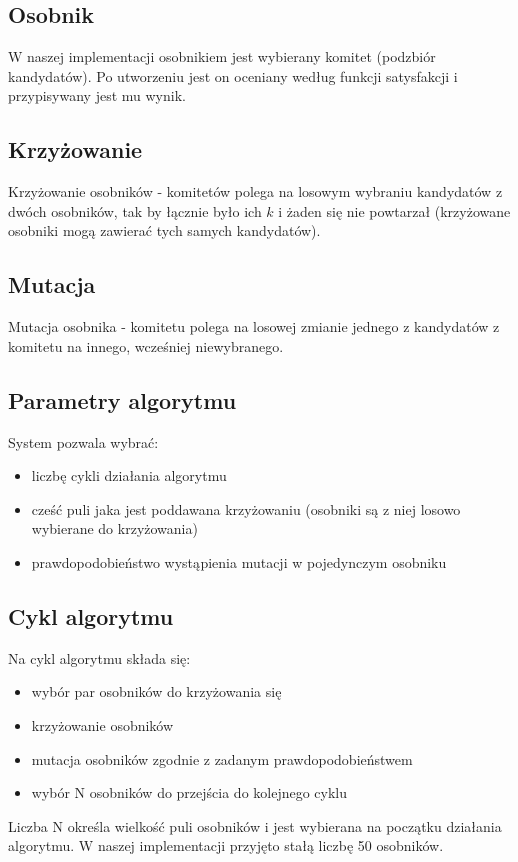 \documentclass[pdflatex,11pt]{../aghdoc_version2}
\begin{document}
\subsection{Osobnik}
W naszej implementacji osobnikiem jest wybierany komitet (podzbiór kandydatów). 
Po utworzeniu jest on oceniany według funkcji satysfakcji i przypisywany jest mu wynik.

\subsection{Krzyżowanie}
Krzyżowanie osobników - komitetów polega na losowym wybraniu kandydatów z dwóch osobników, tak by łącznie było ich $k$ i żaden się nie powtarzał (krzyżowane osobniki mogą zawierać tych samych kandydatów).

\subsection{Mutacja}
Mutacja osobnika - komitetu polega na losowej zmianie jednego z kandydatów z komitetu na innego, wcześniej niewybranego.

\subsection{Parametry algorytmu}
System pozwala wybrać:
\begin{itemize}
\item liczbę cykli działania algorytmu
\item cześć puli jaka jest poddawana krzyżowaniu (osobniki są z niej losowo wybierane do krzyżowania)
\item prawdopodobieństwo wystąpienia mutacji w pojedynczym osobniku
\end{itemize}

\subsection{Cykl algorytmu}
Na cykl algorytmu składa się:
\begin{itemize}
\item wybór par osobników do krzyżowania się
\item krzyżowanie osobników
\item mutacja osobników zgodnie z zadanym prawdopodobieństwem
\item wybór N osobników do przejścia do kolejnego cyklu
\end{itemize}

Liczba N określa wielkość puli osobników i jest wybierana na początku działania algorytmu. W naszej implementacji przyjęto stałą liczbę 50 osobników.
\end{document}
